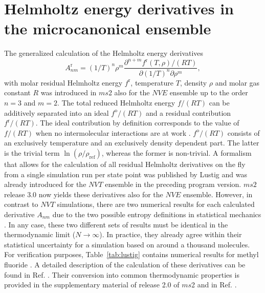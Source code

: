 \documentclass[preprint,12pt]{elsarticle}
\begin{document}
\section{Helmholtz energy derivatives in the microcanonical ensemble}
\label{sec:lustig}

The generalized calculation of the Helmholtz energy derivatives 
\begin{equation} 
A^\text{r}_{nm}=(1/T)^n \rho^m \frac{\partial^{n+m}f^\text{r}(T,\rho)/(RT)}{\partial(1/T)^n \partial \rho^m},
\label{eq:helmholtzderiv}
\end{equation}
with molar residual Helmholtz energy $f^\text{r}$, temperature $T$, density $\rho$ and molar gas constant $R$ was introduced in $ms$2 also for the $NVE$ ensemble up to the order $n=3$ and $m=2$. The total reduced Helmholtz energy $f/(RT)$ can be additively separated into an ideal $f^\text{o}/(RT)$ and a residual contribution $f^\text{r}/(RT)$. The ideal contribution by definition corresponds to the value of $f/(RT)$ when no intermolecular interactions are at work \cite{spa00}. $f^\text{o}/(RT)$ consists of an exclusively temperature and an exclusively density dependent part. The latter is the trivial term $\ln(\rho/\rho_\text{ref})$, whereas the former is non-trivial. A formalism that allows for the calculation of all residual Helmholtz derivatives on the fly from a single simulation run per state point was published by Lustig \cite{lus11, lus12} and was already introduced for the $NVT$ ensemble in the preceding program version. $ms2$ release 3.0 now yields these derivatives also for the $NVE$ ensemble. However, in contrast to $NVT$ simulations, there are two numerical results for each calculated derivative $A_{nm}$ due to the two possible entropy definitions in statistical mechanics \cite{lus12}. In any case, these two different sets of results must be identical in the thermodynamic limit ($N \longrightarrow \infty$). In practice, they already agree within their statistical uncertainty for a simulation based on around a thousand molecules. For verification purposes, Table~\ref{tab:lustig} contains numerical results for methyl fluoride \cite{sto03}. A detailed description of the calculation of these derivatives can be found in Ref. \cite{lus12}. Their conversion into common thermodynamic properties is provided in the supplementary material of release 2.0 of $ms$2 \cite{ms2_2.0} and in Ref. \cite{spa00}.
\end{document}
